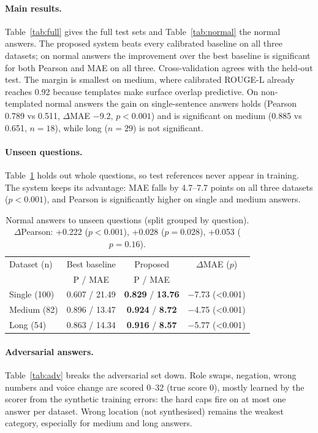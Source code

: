 \documentclass[10pt,a4paper,twocolumn]{article}
\newcommand{\best}[1]{\textbf{#1}}
\begin{document}
\paragraph{Main results.}
Table~\ref{tab:full} gives the full test sets and Table~\ref{tab:normal} the
normal answers. The proposed system beats every calibrated baseline on all
three datasets; on normal answers the improvement over the best baseline is
significant for both Pearson and MAE on all three. Cross-validation agrees
with the held-out test. The margin is smallest on medium, where calibrated
ROUGE-L already reaches 0.92 because templates make surface overlap
predictive. On non-templated normal answers the gain on single-sentence
answers holds (Pearson 0.789 vs 0.511, $\Delta$MAE $-$9.2, $p<0.001$) and is
significant on medium (0.885 vs 0.651, $n=18$), while long ($n=29$) is not
significant.

\paragraph{Unseen questions.}
Table~\ref{tab:unseen} holds out whole questions, so test references never
appear in training. The system keeps its advantage: MAE falls by 4.7--7.7
points on all three datasets ($p<0.001$), and Pearson is significantly
higher on single and medium answers.

\begin{table}[t]
\centering\small
\begin{tabular}{lccc}
\toprule
Dataset (n) & Best baseline & Proposed & $\Delta$MAE ($p$) \\
 & P / MAE & P / MAE & \\
\midrule
Single (100) & 0.607 / 21.49 & \best{0.829} / \best{13.76} & $-$7.73 (<0.001) \\
Medium (82) & 0.896 / 13.47 & \best{0.924} / \best{8.72} & $-$4.75 (<0.001) \\
Long (54) & 0.863 / 14.34 & \best{0.916} / \best{8.57} & $-$5.77 (<0.001) \\
\bottomrule
\end{tabular}
\caption{Normal answers to unseen questions (split grouped by question). $\Delta$Pearson: +0.222 ($p<0.001$), +0.028 ($p=0.028$), +0.053 ($p=0.16$).}
\label{tab:unseen}
\end{table}

\paragraph{Adversarial answers.}
Table~\ref{tab:adv} breaks the adversarial set down. Role swaps, negation,
wrong numbers and voice change are scored 0--32 (true score 0), mostly
learned by the scorer from the synthetic training errors: the hard caps fire
on at most one answer per dataset. Wrong location (not synthesised) remains
the weakest category, especially for medium and long answers.
\end{document}
